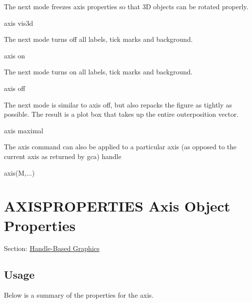  The next mode freezes axis properties so that 3\-D objects can be rotated properly. \begin{DoxyVerb}  axis vis3d
\end{DoxyVerb}
 The next mode turns off all labels, tick marks and background. \begin{DoxyVerb}  axis on
\end{DoxyVerb}
 The next mode turns on all labels, tick marks and background. \begin{DoxyVerb}  axis off
\end{DoxyVerb}
 The next mode is similar to {\ttfamily axis off}, but also repacks the figure as tightly as possible. The result is a plot box that takes up the entire {\ttfamily outerposition} vector. \begin{DoxyVerb}  axis maximal
\end{DoxyVerb}
 The {\ttfamily axis} command can also be applied to a particular axis (as opposed to the current axis as returned by {\ttfamily gca}) handle \begin{DoxyVerb}  axis(M,...)
\end{DoxyVerb}
 \hypertarget{handle_axisproperties}{}\section{A\-X\-I\-S\-P\-R\-O\-P\-E\-R\-T\-I\-E\-S Axis Object Properties}\label{handle_axisproperties}
Section\-: \hyperlink{sec_handle}{Handle-\/\-Based Graphics} \hypertarget{vtkwidgets_vtkxyplotwidget_Usage}{}\subsection{Usage}\label{vtkwidgets_vtkxyplotwidget_Usage}
Below is a summary of the properties for the axis. 
